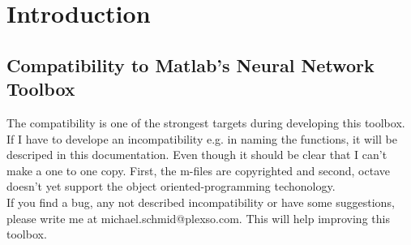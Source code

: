 \chapter{Introduction}

\section{Compatibility to Matlab's \texttrademark Neural Network Toolbox}
The compatibility is one of the strongest targets during developing this toolbox.
If I have to develope an incompatibility e.g. in naming the functions, it will be descriped
in this documentation. Even though it should be clear that I can't make a one to one copy.  First,
the m-files are copyrighted and second, octave doesn't yet support the object oriented-programming techonology.\\

If you find a bug, any not described incompatibility or have some suggestions, please write me at
michael.schmid@plexso.com. This will help improving this toolbox.







